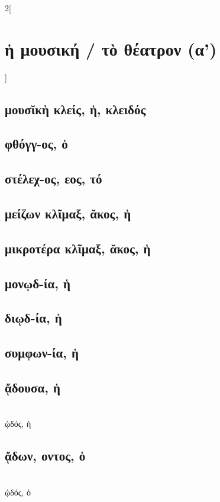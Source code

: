 \documentclass{book}
\begin{document}
\begin{multicols}{2}[\section{ἡ μουσική / τὸ θέατρον (α')}] 
\subsection{μουσῐκὴ κλείς, ἡ, κλειδός}
\subsection{φθόγγ-ος, ὁ}
\subsection{στέλεχ-ος, εος, τό}
\subsection{μείζων κλῖμαξ, ᾰκος, ἡ}
\subsection{μικροτέρα κλῖμαξ, ᾰκος, ἡ}
\subsection{μονῳδ-ία, ἡ}
\subsection{διῳδ-ία, ἡ}
\subsection{συμφων-ία, ἡ}
\subsection{ᾄδουσα, ἡ}  ~\\
ᾠδός, ἡ 
\subsection{ᾄδων, οντος, ὁ}  ~\\
ᾠδός, ὁ 

\end{multicols}
\end{document}
